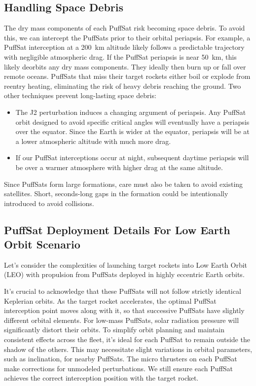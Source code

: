 \documentclass{article}
\begin{document}
{\subsection{Handling Space Debris} \label{sec:handling_space_debris}
The dry mass components of each PuffSat risk becoming space debris. To avoid this, we can intercept the PuffSats prior to their orbital periapsis.   For example, a PuffSat interception at a \SI{200}{\kilo\meter} altitude likely follows a predictable trajectory with negligible atmospheric drag.   If the PuffSat periapsis is near \SI{50}{\kilo\meter}, this likely deorbits any dry mass components.   They ideally then burn up or fall over remote oceans.  PuffSats that miss their target rockets either boil or explode from reentry heating, eliminating the risk of heavy debris reaching the ground. Two other techniques prevent long-lasting space debris:

\begin{itemize}
\item The J2 perturbation induces a changing argument of periapsis. Any PuffSat orbit designed to avoid specific critical angles will eventually have a periapsis over the equator.  Since the Earth is wider at the equator, periapsis will be at a lower atmospheric altitude with much more drag.
\item If our PuffSat interceptions occur at night, subsequent daytime periapsis will be over a warmer atmosphere with higher drag at the same altitude.
\end{itemize}

Since PuffSats form large formations, care must also be taken to avoid existing satellites.  Short, seconds-long gaps in the formation could be intentionally introduced to avoid collisions.

\subsection{PuffSat Deployment Details For Low Earth Orbit Scenario}\label{sec:leo_orbit_details}
Let's consider the complexities of launching target rockets into Low Earth Orbit (LEO) with propulsion from PuffSats deployed in highly eccentric Earth orbits.

It's crucial to acknowledge that these PuffSats will not follow strictly identical Keplerian orbits. As the target rocket accelerates, the optimal PuffSat interception point moves along with it, so that successive PuffSats have slightly different orbital elements.
For low-mass PuffSats, solar radiation pressure will significantly distort their orbits. To simplify orbit planning and maintain consistent  effects across the fleet, it's ideal for each PuffSat to remain outside the shadow of the others. This may necessitate slight variations in orbital parameters, such as inclination, for nearby PuffSats. The micro thrusters on each PuffSat  make corrections for unmodeled perturbations.  We still ensure each PuffSat achieves the correct interception position with the target rocket.   

}
\end{document}
